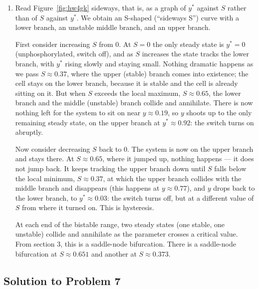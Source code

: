 \documentclass[a4paper,12pt]{article}
\begin{document}
\begin{enumerate}[label=(\alph*)]
\item Read Figure~\ref{fig:hw4gk} sideways, that is, as a graph of $y^*$ against $S$ rather than of $S$ against $y^*$. We obtain an S-shaped (``sideways S'') curve with a lower branch, an unstable middle branch, and an upper branch.

First consider increasing $S$ from $0$. At $S=0$ the only steady state is $y^*=0$ (unphosphorylated, switch off), and as $S$ increases the state tracks the lower branch, with $y^*$ rising slowly and staying small. Nothing dramatic happens as we pass $S \approx 0.37$, where the upper (stable) branch comes into existence; the cell stays on the lower branch, because it is stable and the cell is already sitting on it. But when $S$ exceeds the local maximum, $S \approx 0.65$, the lower branch and the middle (unstable) branch collide and annihilate. There is now nothing left for the system to sit on near $y \approx 0.19$, so $y$ shoots up to the only remaining steady state, on the upper branch at $y^* \approx 0.92$: the switch turns on abruptly.

Now consider decreasing $S$ back to $0$. The system is now on the upper branch and stays there. At $S \approx 0.65$, where it jumped up, nothing happens --- it does not jump back. It keeps tracking the upper branch down until $S$ falls below the local minimum, $S \approx 0.37$, at which the upper branch collides with the middle branch and disappears (this happens at $y \approx 0.77$), and $y$ drops back to the lower branch, to $y^* \approx 0.03$: the switch turns off, but at a different value of $S$ from where it turned on.
This is hysteresis.

At each end of the bistable range, two steady states (one stable, one unstable) collide and annihilate as the parameter crosses a critical value. From section 3, this is a saddle-node bifurcation. There is a saddle-node bifurcation at $S \approx 0.651$ and another at $S \approx 0.373$.
\end{enumerate}

\subsection*{Solution to Problem 7}
\end{document}
